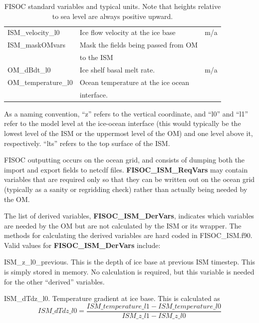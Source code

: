 \documentclass[12pt]{article}
\begin{document}
\begin{table}
\begin{center}
\begin{tabular}{ l|l|l }
      ISM\_velocity\_l0     & Ice flow velocity at the ice base            & m/a \\
      ISM\_maskOMvars       & Mask the fields being passed from OM         &   \\
                            & to the ISM                                   &   \\
      OM\_dBdt\_l0          & Ice shelf basal melt rate.                   & m/a \\
      OM\_temperature\_l0   & Ocean temperature at the ice ocean           &   \\
                            & interface.                                   &   \\
    \end{tabular}
  \end{center}
  \caption{FISOC standard variables and typical units.  
    Note that heights relative to sea level are always positive upward.}
  \label{tab:vars}
\end{table}

As a naming convention, ``z'' refers to the vertical coordinate, and ``l0'' and ``l1'' refer to the 
model level at the ice-ocean interface (this would typically be the lowest level of the ISM or 
the uppermost level of the OM) and one level above it, respectively. ``lts'' refers to the top 
surface of the ISM.

FISOC outputting occurs on the ocean grid, and consists of dumping both the import and 
export fields to netcdf files. 
\textbf{FISOC\_ISM\_ReqVars} may contain variables that are required only so that they can be written 
out on the ocean grid (typically as a sanity or regridding check) rather 
than actually being needed by the OM.

The list of derived variables, \textbf{FISOC\_ISM\_DerVars}, indicates which variables are needed by the 
OM but are not calculated by the ISM or its wrapper. 
The methods for calculating the derived variables are hard coded in FISOC\_ISM.f90. 
Valid values for  \textbf{FISOC\_ISM\_DerVars} include:

ISM\_z\_l0\_previous.  This is the depth of ice base at previous ISM timestep. This is simply stored 
in memory.  No calculation is required, but this variable is needed for the other ``derived'' variables. 

ISM\_dTdz\_l0.  Temperature gradient at ice base.  This is calculated as 
\begin{equation}
ISM\_dTdz\_l0 = \frac{ISM\_temperature\_l1 - ISM\_temperature\_l0}{ISM\_z\_l1 - ISM\_z\_l0}
\end{equation}
\end{document}
